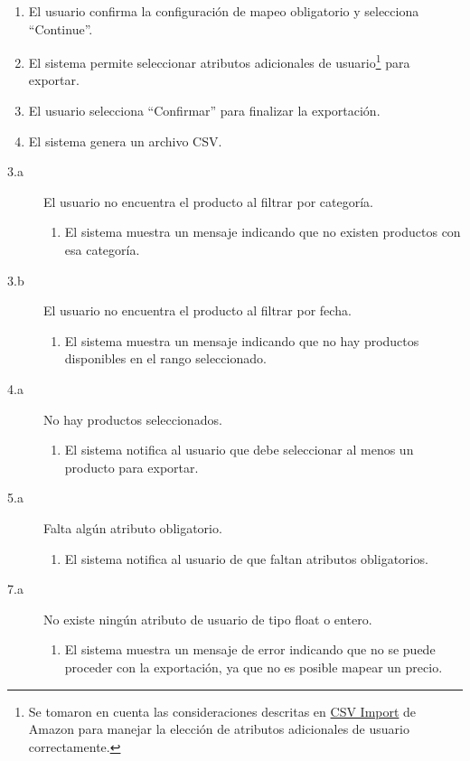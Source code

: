 \begin{enumerate}
    \item El usuario confirma la configuración de mapeo obligatorio y selecciona \enquote{Continue}.
    \item El sistema permite seleccionar atributos adicionales de usuario\footnote{Se tomaron en cuenta las consideraciones descritas en \href{https://buywithprime.amazon.com/knowledge-center/csv-import?utm_medium=website\&utm_source=direct\#standalone-product}{CSV Import} de Amazon para manejar la elección de atributos adicionales de usuario correctamente.} para exportar.
    \item El usuario selecciona \enquote{Confirmar} para finalizar la exportación.
    \item El sistema genera un archivo CSV.
\end{enumerate}

\begin{description}
    \item[3.a] El usuario no encuentra el producto al filtrar por categoría.
    \begin{enumerate}
        \item[3.a.1] El sistema muestra un mensaje indicando que no existen productos con esa categoría.
    \end{enumerate}
    \item[3.b] El usuario no encuentra el producto al filtrar por fecha.
    \begin{enumerate}
        \item[3.b.1] El sistema muestra un mensaje indicando que no hay productos disponibles en el rango seleccionado.
    \end{enumerate}
    \item[4.a] No hay productos seleccionados.
    \begin{enumerate}
        \item[4.a.1] El sistema notifica al usuario que debe seleccionar al menos un producto para exportar.
    \end{enumerate}
    \item[5.a] Falta algún atributo obligatorio.
    \begin{enumerate}
        \item[5.a.1] El sistema notifica al usuario de que faltan atributos obligatorios.
    \end{enumerate}
    \item[7.a] No existe ningún atributo de usuario de tipo float o entero.
    \begin{enumerate}
        \item[7.a.1] El sistema muestra un mensaje de error indicando que no se puede proceder con la exportación, ya que no es posible mapear un precio.
    \end{enumerate}
\end{description}

